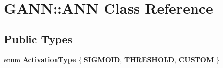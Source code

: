 \hypertarget{class_g_a_n_n_1_1_a_n_n}{}\section{G\+A\+N\+N\+:\+:A\+N\+N Class Reference}
\label{class_g_a_n_n_1_1_a_n_n}
\subsection*{Public Types}
\begin{DoxyCompactItemize}
\item 
\hypertarget{class_g_a_n_n_1_1_a_n_n_a09793a3b1a3e795aed773d1a74a373f9}{}enum {\bfseries Activation\+Type} \{ {\bfseries S\+I\+G\+M\+O\+I\+D}, 
{\bfseries T\+H\+R\+E\+S\+H\+O\+L\+D}, 
{\bfseries C\+U\+S\+T\+O\+M}
 \}\label{class_g_a_n_n_1_1_a_n_n_a09793a3b1a3e795aed773d1a74a373f9}

\end{DoxyCompactItemize}
